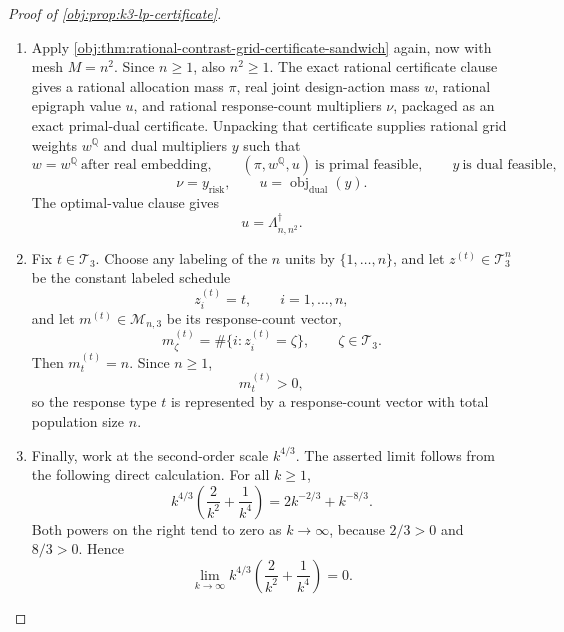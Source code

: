 \begin{proof}[Proof of \cref{obj:prop:k3-lp-certificate}]
\begin{enumerate}
\item Apply \cref{obj:thm:rational-contrast-grid-certificate-sandwich} again, now with mesh \(M=n^2\).  Since \(n\ge1\), also \(n^2\ge1\).  The exact rational certificate clause gives a rational allocation mass \(\pi\), real joint design-action mass \(w\), rational epigraph value \(u\), and rational response-count multipliers \(\nu\), packaged as an exact primal-dual certificate.  Unpacking that certificate supplies rational grid weights \(w^{\mathbb Q}\) and dual multipliers \(y\) such that
\[
w=w^{\mathbb Q}\ \text{after real embedding},\qquad
(\pi,w^{\mathbb Q},u)\ \text{is primal feasible},\qquad
y\ \text{is dual feasible},
\]
\[
\nu=y_{\mathrm{risk}},
\qquad
u=\operatorname{obj}_{\mathrm{dual}}(y).
\]
The optimal-value clause gives
\[
u=\Lambda_{n,n^2}^\dagger .
\]

\item Fix \(t\in\mathcal T_3\).  Choose any labeling of the \(n\) units by \(\{1,\ldots,n\}\), and let \(z^{(t)}\in\mathcal T_3^n\) be the constant labeled schedule
\[
z_i^{(t)}=t,\qquad i=1,\ldots,n,
\]
and let \(m^{(t)}\in\mathcal M_{n,3}\) be its response-count vector,
\[
m^{(t)}_\zeta=\#\{i:z_i^{(t)}=\zeta\},
\qquad \zeta\in\mathcal T_3 .
\]
Then \(m^{(t)}_t=n\).  Since \(n\ge1\),
\[
m^{(t)}_t>0,
\]
so the response type \(t\) is represented by a response-count vector with total population size \(n\).

\item Finally, work at the second-order scale \(k^{4/3}\).  The asserted limit follows from the following direct calculation.  For all \(k\ge1\),
\[
k^{4/3}\left(\frac{2}{k^2}+\frac{1}{k^4}\right)
=
2k^{-2/3}+k^{-8/3}.
\]
Both powers on the right tend to zero as \(k\to\infty\), because \(2/3>0\) and \(8/3>0\).  Hence
\[
\lim_{k\to\infty}
k^{4/3}\left(\frac{2}{k^2}+\frac{1}{k^4}\right)=0 .
\]
\end{enumerate}
\end{proof}

